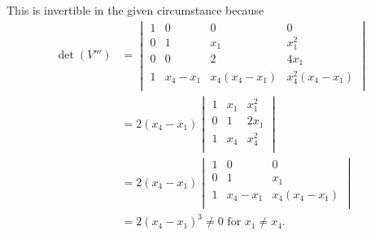 		
	This is invertible in the given circumstance because
	\begin{align*}\det (V''') &=
		\begin{vmatrix}
			1 & 0 & 0 & 0\\
			0 & 1 & x_1 & x_1^2\\
			0 & 0 & 2 & 4x_1\\
			1 & x_4-x_1 & x_4(x_4-x_1) & x_4^2(x_4-x_1)\\
		\end{vmatrix}
		\\
		&= 2 (x_4-x_1)
		\begin{vmatrix}
			1 & x_1 & x_1^2\\
			0 & 1 & 2x_1\\
			1 & x_4 & x_4^2\\
		\end{vmatrix}
		\\
		&= 2 (x_4-x_1)
		\begin{vmatrix}
			1 & 0 & 0\\
			0 & 1 & x_1\\
			1 & x_4-x_1 & x_4(x_4-x_1)\\
		\end{vmatrix}
		\\
		&= 2 (x_4-x_1)^3 \neq 0 \text{ for } x_1\neq x_4.
	\end{align*}